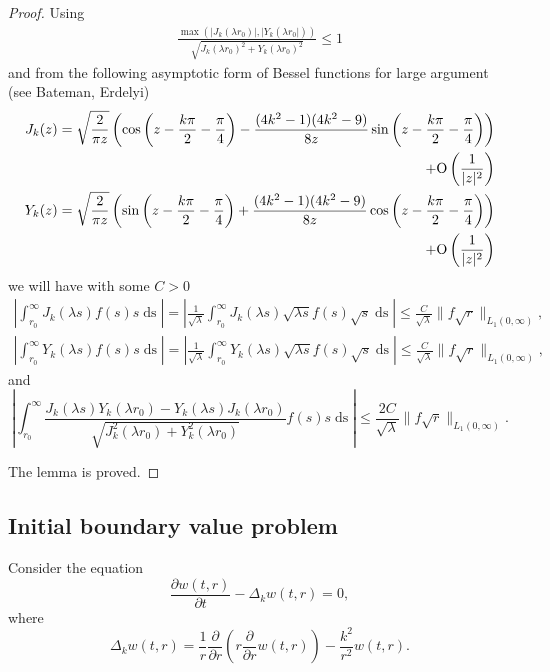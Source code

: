 \documentclass[manuscript, printscheme]{paper}
\newcommand{\ds}{\operatorname{ds}}
\begin{document}
\begin{proof}
Using 
\begin{align}\label{wkk:estJY}
 \frac{  \max \left(|J_{k}(\lambda r_0)|, |Y_{k}(\lambda r_0|)\right) }{\sqrt {{J_{k}(\lambda r_0)^2 + Y_{k}(\lambda r_0)^2}}}  \leq 1
\end{align}
and from the following asymptotic form of Bessel functions for large argument (see Bateman, Erdelyi\cite{BE})
\begin{align}\label{wkk:asymp1}
J_{k }(z)={\sqrt {\frac {2}{\pi z}}}\left(\cos \left(z-{\frac {k \pi }{2}}-{\frac {\pi }{4}}\right) - {(4k^2-1)(4k^2-9) \over 8z } \sin \left(z-{\frac {k \pi }{2}}-{\frac {\pi }{4}}\right) \right) 
   \\+\mathrm {O} \left({1 \over |z|^{2}} \right) \nonumber \\\label{wkk:asymp2}
   Y_{k }(z)={\sqrt {\frac {2}{\pi z}}}\left(\sin \left(z-{\frac {k \pi }{2}}-{\frac {\pi }{4}}\right) + {(4k^2-1)(4k^2-9) \over 8z } \cos \left(z-{\frac {k \pi }{2}}-{\frac {\pi }{4}}\right) \right) 
   \\+\mathrm {O} \left({1 \over |z|^{2}} \right) \nonumber 
\end{align}
we will have with some $C>0$
\begin{align*}
\left | \int_{r_0}^\infty
J_{k}(\lambda s) f(s) s\ds \right | =
\left |\frac 1{\sqrt {\lambda}} \int_{r_0}^\infty
J_{k}(\lambda s) \sqrt {\lambda  s}f(s)\sqrt s \ds \right | \leq \frac C {\sqrt \lambda} \|f \sqrt r \|_{L_1(0,\infty)},\\
\left | \int_{r_0}^\infty
Y_{k}(\lambda s) f(s) s\ds \right | =
\left |\frac 1{\sqrt {\lambda}} \int_{r_0}^\infty
Y_{k}(\lambda s) \sqrt {\lambda  s}f(s)\sqrt s \ds \right | \leq \frac C {\sqrt \lambda} \|f \sqrt r \|_{L_1(0,\infty)},
\end{align*}
and
$$
\left | \int_{r_0}^\infty \frac{J_{k}(\lambda s)Y_{k}(\lambda r_0) - Y_{k}(\lambda s)J_{k}(\lambda r_0)}{\sqrt{J_{k}^2(\lambda r_0) + Y_{k}^2(\lambda r_0)}} f(s) s \ds \right | \leq \frac {2C} {\sqrt \lambda} \|f \sqrt r \|_{L_1(0,\infty)}.
$$

The lemma is proved.

\end{proof}

\subsection{Initial boundary value problem}

Consider the equation
\begin{equation} \label{wkk:omegaeqpolar}
\frac{\partial w(t,r)}{\partial t} - \Delta_k w(t,r) = 0,
\end{equation}
where
$$
\Delta_k w(t,r) = \frac 1r \frac {\partial}{\partial r}\left(r \frac {\partial}{\partial r}w(t,r)\right) - \frac{k^2}{r^2} w(t,r).
$$
\end{document}
